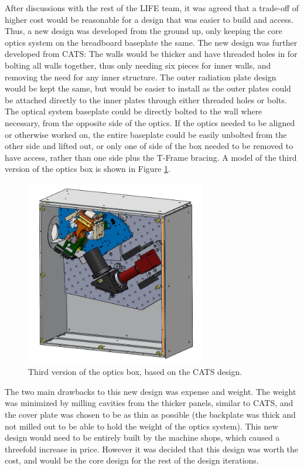 After discussions with the rest of the LIFE team, it was agreed that a trade-off of higher cost would be reasonable for a design that was easier to build and access. Thus, a new design was developed from the ground up, only keeping the core optics system on the breadboard baseplate the same. The new design was further developed from CATS: The walls would be thicker and have threaded holes in for bolting all walls together, thus only needing six pieces for inner walls, and removing the need for any inner structure. The outer radiation plate design would be kept the same, but would be easier to install as the outer plates could be attached directly to the inner plates through either threaded holes or bolts. The optical system baseplate could be directly bolted to the wall where necessary, from the opposite side of the optics. If the optics needed to be aligned or otherwise worked on, the entire baseplate could be easily unbolted from the other side and lifted out, or only one of side of the box needed to be removed to have access, rather than one side plus the T-Frame bracing. A model of the third version of the optics box is shown in Figure \ref{fig:OB_V3}. 

\begin{figure}
    \centering
    \includegraphics[width=0.7\textwidth]{chap3_images/LIFE_V3_images/Optics_Box_V2.JPG}
    \caption{Third version of the optics box, based on the CATS design.}
    \label{fig:OB_V3}
\end{figure}

The two main drawbacks to this new design was expense and weight. The weight was minimized by milling cavities from the thicker panels, similar to CATS, and the cover plate was chosen to be as thin as possible (the backplate was thick and not milled out to be able to hold the weight of the optics system). This new design would need to be entirely built by the machine shops, which caused a threefold increase in price. However it was decided that this design was worth the cost, and would be the core design for the rest of the design iterations.

